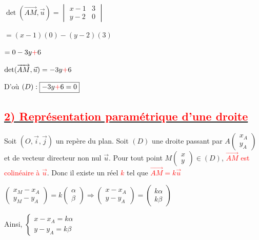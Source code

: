 \documentclass[12pt,a4paper]{article}
\begin{document}
$\det(\overrightarrow{AM}, \vec{u}) = \begin{vmatrix} x - 1 & 3 \\ y - 2 & 0 \end{vmatrix}$

\indent \enspace \qquad \qquad $= (x - 1)(0) - (y - 2)(3)$

\indent \enspace \qquad \qquad $= 0 - 3y \textcolor{red}{+} 6$

$\det(\overrightarrow{AM}, \vec{u}) = -3y \textcolor{red}{+} 6$

\noindent D'où $(D) : \boxed{-3y \textcolor{red}{+} 6 = 0}$

\subsection*{\underline{\textcolor{red}{2) Représentation paramétrique d'une droite}}}

Soit $(O, \vec{i}, \vec{j})$ un repère du plan.
Soit $(D)$ une droite passant par $A \begin{pmatrix} x_A \\ y_A \end{pmatrix}$ et de vecteur directeur non nul $\vec{u}$.
Pour tout point $M \begin{pmatrix} x \\ y \end{pmatrix} \in (D)$, \textcolor{red}{$\overrightarrow{AM}$ est colinéaire à $\vec{u}$}. Donc il existe un réel \textcolor{red}{$k$} tel que \textcolor{red}{$\overrightarrow{AM} = k\vec{u}$}

$\begin{pmatrix} x_M - x_A \\ y_M - y_A \end{pmatrix} = k \begin{pmatrix} \alpha \\ \beta \end{pmatrix} \Rightarrow \begin{pmatrix} x - x_A \\ y - y_A \end{pmatrix} = \begin{pmatrix} k\alpha \\ k\beta \end{pmatrix}$

Ainsi, $\begin{cases} x - x_A = k\alpha \\ y - y_A = k\beta \end{cases}$
\end{document}
